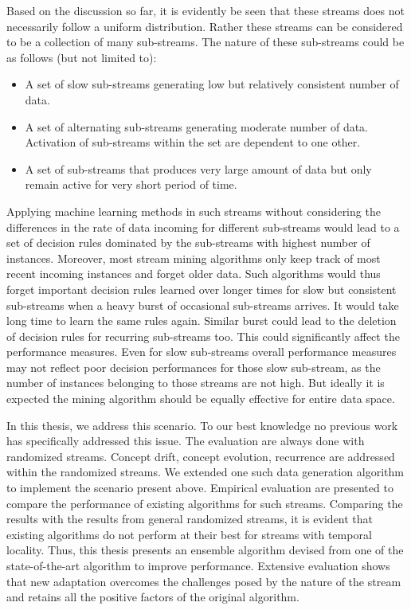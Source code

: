 Based on the discussion so far, it is evidently be seen that these streams does not necessarily follow a uniform distribution. Rather these streams can be considered to be a collection of many sub-streams. The nature of these sub-streams could be as follows (but not limited to):
\begin{itemize}
    \item A set of slow sub-streams generating low but relatively consistent number of data.
    \item A set of alternating sub-streams generating moderate number of data. Activation of sub-streams within the set are dependent to one other.
    \item A set of sub-streams that produces very large amount of data but only remain active for very short period of time.
\end{itemize}

Applying machine learning methods in such streams without considering the differences in the rate of data incoming for different sub-streams would lead to a set of decision rules dominated by the sub-streams with highest number of instances. Moreover, most stream mining algorithms only keep track of most recent incoming instances and forget older data. Such algorithms would thus forget important decision rules learned over longer times for slow but consistent sub-streams when a heavy burst of occasional sub-streams arrives. It would take long time to learn the same rules again. Similar burst could lead to the deletion of decision rules for recurring sub-streams too. This could significantly affect the performance measures. Even for slow sub-streams overall performance measures may not reflect poor decision performances for those slow sub-stream, as the number of instances belonging to those streams are not high. But ideally it is expected the mining algorithm should be equally effective for entire data space.

In this thesis, we address this scenario. To our best knowledge no previous work has specifically addressed this issue. The evaluation are always done with randomized streams. Concept drift, concept evolution, recurrence are addressed within the randomized streams. We extended one such data generation algorithm to implement the scenario present above. Empirical evaluation are presented to compare the performance of existing algorithms for such streams. Comparing the results with the results from general randomized streams, it is evident that existing algorithms do not perform at their best for streams with temporal locality. Thus, this thesis presents an ensemble algorithm devised from one of the state-of-the-art algorithm to improve performance. Extensive evaluation shows that new adaptation overcomes the challenges posed by the nature of the stream and retains all the positive factors of the original algorithm.

